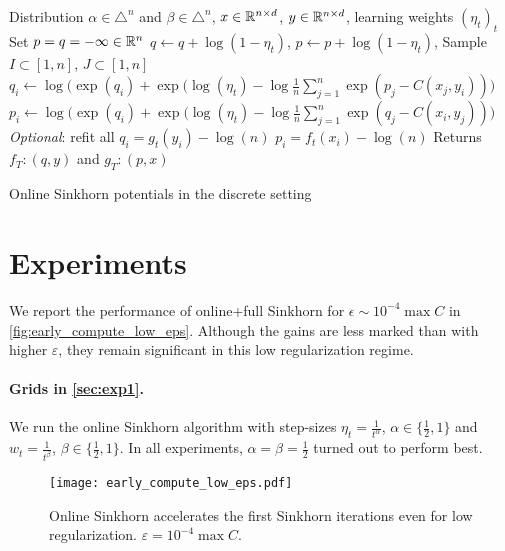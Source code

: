\begin{algorithm}[t]
    \begin{algorithmic}
    \Input Distribution $\alpha \in \triangle^n$ and 
    $\beta \in \triangle^n$, $x \in \mathbb{R}^{n \times d}$, 
    $y \in \mathbb{R}^{n \times d}$, learning weights ${(\eta_t)}_t$
    \State Set $p = q = - \infty \in \mathbb{R}^n$
        \State $q \gets q + \log(1 - \eta_t)$, $p \gets p + \log(1 - \eta_t)$,
        \State Sample $I \subset [1, n]$, $J \subset [1, n]$
            \State $q_i \gets \log \big( \exp(q_i)
            + \exp(\log(\eta_t) - \log \frac{1}{n} 
            \sum_{j=1}^{n} \exp(p_j - C(x_j, y_i)) \big) $
        \EndFor
        \State $p_i \gets \log \big( \exp(q_i)
        + \exp(\log(\eta_t) - \log \frac{1}{n} 
        \sum_{j=1}^{n} \exp(q_j - C(x_i, y_j)) \big)$
        \EndFor
        \State \textit{Optional}: refit all $q_i = g_t(y_i) - \log (n)$
        \State\hspace{2.45cm} $p_i = f_t(x_i) - \log (n)$
    \EndFor
    \State Returns $f_T : (q, y)$ and
    $g_T : (p, x)$
    \end{algorithmic}
    \caption{Online Sinkhorn potentials in the discrete setting}\label{alg:discrete_online}
\end{algorithm}



\section{Experiments}\label{sec:supp_exp}

We report the performance of online+full Sinkhorn for $\epsilon \sim 10^{-4}
\max C$ in \autoref{fig:early_compute_low_eps}. Although the gains are less
marked than with higher $\varepsilon$, they remain significant in this low
regularization regime.

\paragraph{Grids in \autoref{sec:exp1}.} We run the online Sinkhorn algorithm
with step-sizes $\eta_t = \frac{1}{t^\alpha}$, $\alpha \in \{ \frac{1}{2}, 1 \}$
and $w_t = \frac{1}{{t^\beta}}$, $\beta \in \{ \frac{1}{2}, 1 \}$. In all
experiments, $\alpha = \beta = \frac{1}{2}$ turned out to perform best.

\begin{figure}[ht]
    \centering
    \texttt{[image: early\_compute\_low\_eps.pdf]}
    \caption{Online Sinkhorn accelerates the first Sinkhorn iterations even for low regularization. $\varepsilon = 10^{-4} \max C$.}
    \label{fig:early_compute_low_eps}
\end{figure}
